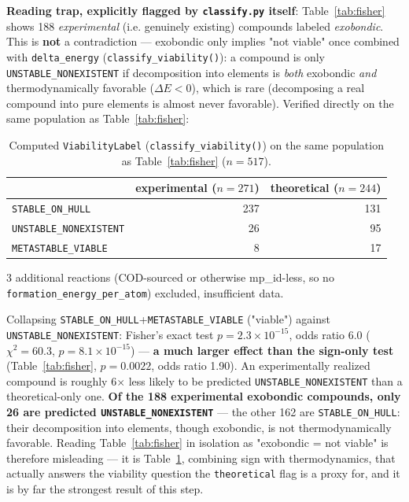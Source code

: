 \documentclass[11pt,a4paper]{article}
\begin{document}
\textbf{Reading trap, explicitly flagged by \texttt{classify.py} itself}:
Table~\ref{tab:fisher} shows 188 \emph{experimental} (i.e. genuinely
existing) compounds labeled \emph{exobondic}. This is \textbf{not} a
contradiction --- exobondic only implies "not viable" once combined with
\texttt{delta\_energy} (\texttt{classify\_viability()}): a compound is
only \texttt{UNSTABLE\_NONEXISTENT} if decomposition into elements is
\emph{both} exobondic \emph{and} thermodynamically favorable
($\Delta E<0$), which is rare (decomposing a real compound into pure
elements is almost never favorable). Verified directly on the same
population as Table~\ref{tab:fisher}:

\begin{table}[htbp]
\centering
\caption{Computed \texttt{ViabilityLabel} (\texttt{classify\_viability()}) on the same population as Table~\ref{tab:fisher} ($n=517$).}
\label{tab:viability-check}
\begin{tabular}{@{}lrr@{}}
\toprule
 & experimental ($n=271$) & theoretical ($n=244$) \\
\midrule
\texttt{STABLE\_ON\_HULL}        & 237 & 131 \\
\texttt{UNSTABLE\_NONEXISTENT}   & 26  & 95 \\
\texttt{METASTABLE\_VIABLE}      & 8   & 17 \\
\bottomrule
\end{tabular}

\vspace{0.15cm}
{\footnotesize 3 additional reactions (COD-sourced or otherwise
mp\_id-less, so no \texttt{formation\_energy\_per\_atom}) excluded,
insufficient data.}
\end{table}

Collapsing \texttt{STABLE\_ON\_HULL}+\texttt{METASTABLE\_VIABLE}
("viable") against \texttt{UNSTABLE\_NONEXISTENT}: Fisher's exact test
$p=2.3\times10^{-15}$, odds ratio $\mathbf{6.0}$ ($\chi^2=60.3$,
$p=8.1\times10^{-15}$) --- \textbf{a much larger effect than the
sign-only test} (Table~\ref{tab:fisher}, $p=0.0022$, odds ratio 1.90).
An experimentally realized compound is roughly 6$\times$ less likely to
be predicted \texttt{UNSTABLE\_NONEXISTENT} than a theoretical-only one.
\textbf{Of the 188 experimental exobondic compounds, only 26 are
predicted \texttt{UNSTABLE\_NONEXISTENT}} --- the other 162 are
\texttt{STABLE\_ON\_HULL}: their decomposition into elements, though
exobondic, is not thermodynamically favorable. Reading Table~\ref{tab:fisher}
in isolation as "exobondic = not viable" is therefore misleading --- it
is Table~\ref{tab:viability-check}, combining sign with thermodynamics,
that actually answers the viability question the \texttt{theoretical}
flag is a proxy for, and it is by far the strongest result of this step.
\end{document}
